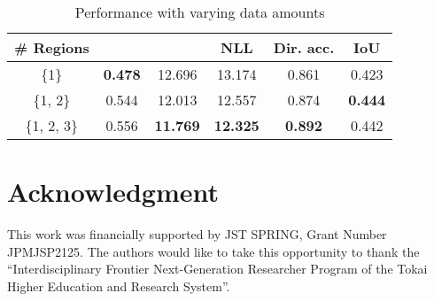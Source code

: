 \documentclass[letterpaper, 10 pt, conference]{ieeeconf}
\begin{document}
\begin{table}[t]\caption{Performance with varying data amounts}
\vspace{-4mm}
\begin{center}
\begin{tabular}{|c|c|c|c|c|c|}
    \hline
     \# Regions &  &  & NLL & Dir. acc. & IoU \\ \hline
    \{1\} & \textbf{0.478} & 12.696 & 13.174 & 0.861 & 0.423 \\ \hline
    \{1, 2\} & 0.544 & 12.013 & 12.557 & 0.874 & \textbf{0.444} \\ \hline
    \{1, 2, 3\} & 0.556 & \textbf{11.769} & \textbf{12.325} & \textbf{0.892} & 0.442 \\ \hline
\end{tabular}
\label{tab:data_amount}
\end{center}
\vspace{-7.5mm}
\end{table}













\section*{Acknowledgment}

This work was financially supported by JST SPRING, Grant Number JPMJSP2125. The authors would like to take this opportunity to thank the ``Interdisciplinary Frontier Next-Generation Researcher Program of the Tokai Higher Education and Research System''.
\end{document}
